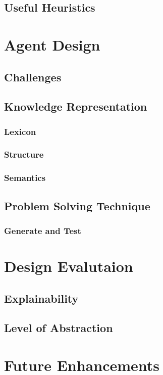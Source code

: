 \documentclass[
	letterpaper, %
]{jdf}
\begin{document}
\subsection{Useful Heuristics}


\section{Agent Design}
\subsection{Challenges}
\subsection{Knowledge Representation}
\subsubsection{Lexicon}
\subsubsection{Structure}
\subsubsection{Semantics}
\subsection{Problem Solving Technique}
\subsubsection{Generate and Test}

\section{Design Evalutaion}
\subsection{Explainability}
\subsection{Level of Abstraction}

\section{Future Enhancements}
\end{document}
